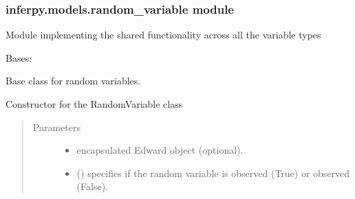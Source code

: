 \documentclass[letterpaper,10pt,english]{sphinxmanual}
\begin{document}
\subsubsection{inferpy.models.random\_variable module}
\label{\detokenize{modules/inferpy.models:module-inferpy.models.random_variable}}\label{\detokenize{modules/inferpy.models:inferpy-models-random-variable-module}}
Module implementing the shared functionality across all the variable types

\begin{fulllineitems}
\label{\detokenize{modules/inferpy.models:inferpy.models.random_variable.RandomVariable}}
Bases: 

Base class for random variables.

\begin{fulllineitems}
\label{\detokenize{modules/inferpy.models:inferpy.models.random_variable.RandomVariable.__init__}}
Constructor for the RandomVariable class
\begin{quote}\begin{description}
\item[{Parameters}] \leavevmode\begin{itemize}
\item {} 
 \textendash{} encapsulated Edward object (optional).

\item {} 
 () \textendash{} specifies if the random variable is observed (True) or observed (False).

\end{itemize}

\end{description}\end{quote}

\end{fulllineitems}



\end{fulllineitems}
\end{document}
